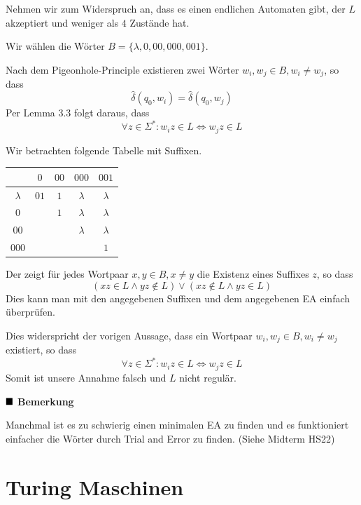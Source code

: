 \documentclass[a4paper, 11pt]{article}
\begin{document}
        Nehmen wir zum Widerspruch an, dass es einen endlichen Automaten gibt, der $L$ akzeptiert und weniger als $4$ Zustände hat.
    
        Wir wählen die Wörter $B = \{\lambda, 0, 00, 000, 001\}$.
    
        Nach dem Pigeonhole-Principle existieren zwei Wörter $w_i, w_j \in B, w_i \neq w_j$, so dass 
        $$\hat{\delta}(q_0, w_i) = \hat{\delta}(q_0, w_j)$$
        Per Lemma 3.3 folgt daraus, dass 
        $$\forall z \in \Sigma^*: w_iz \in L \iff w_jz \in L$$
        
        Wir betrachten folgende Tabelle mit Suffixen.
        \begin{table}
            \centering
            \begin{tabular}{c|cccc}
                          & $0$  & $00$& $000$     & $001$    \\
                \hline
                $\lambda$ & $01$ & $1$ & $\lambda$ & $\lambda$\\
                $0$       &      & $1$ & $\lambda$ & $\lambda$\\
                $00$      &      &     & $\lambda$ & $\lambda$ \\
                $000$     &      &     &           & $1$ 
            \end{tabular}
        \end{table}
        Der zeigt für jedes Wortpaar $x, y \in B, x \neq y$ die Existenz eines Suffixes $z$, so dass 
        $$\left(xz \in L \land yz \notin L\right) \lor \left(xz \notin L \land yz \in L\right)$$
        Dies kann man mit den angegebenen Suffixen und dem angegebenen EA einfach überprüfen.
    
        Dies widerspricht der vorigen Aussage, dass ein Wortpaar $w_i, w_j \in B, w_i \neq w_j$ existiert, so dass
        $$\forall z \in \Sigma^*: w_iz \in L \iff w_jz \in L$$
        Somit ist unsere Annahme falsch und $L$ nicht regulär.
    
        $\hfill\blacksquare$
    \textbf{Bemerkung}

        Manchmal ist es zu schwierig einen minimalen EA zu finden und es funktioniert einfacher die Wörter durch Trial and Error zu finden. (Siehe Midterm HS22)
    
    
    
    \section{Turing Maschinen}
    
\end{document}
